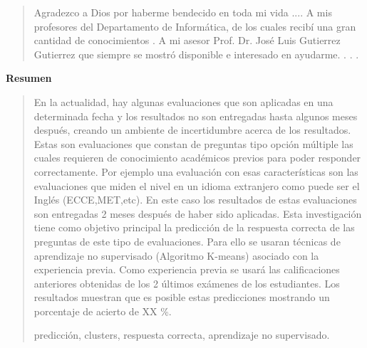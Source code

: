  {\bf\Large {}}
 \vskip 1.5cm
\begin{quotation}
Agradezco a Dios por haberme bendecido en toda mi vida ....
{\vskip 1cm}
A mis profesores del Departamento de Informática, de los cuales recibí una gran cantidad de conocimientos  . 
\vskip 1cm
A  mi  asesor  Prof.  Dr.  José  Luis  Gutierrez Gutierrez  que  siempre  se  mostró disponible e interesado en ayudarme.
\vskip 1cm
 . . .
 \end{quotation}


\newpage
\begin{center}
 {\bf\LARGE Resumen}
\end{center} 
\begin{quotation}
\vskip 0.5cm
En la actualidad, hay algunas evaluaciones que son aplicadas en una determinada fecha y los resultados no son entregadas hasta algunos meses después, creando un ambiente de incertidumbre acerca de los resultados. Estas son evaluaciones que constan  de  preguntas  tipo  opción  múltiple  las  cuales  requieren  de  conocimiento académicos previos para poder responder correctamente. Por ejemplo una evaluación con esas características son las evaluaciones que miden el nivel en un idioma extranjero  como  puede  ser  el  Inglés  (ECCE,MET,etc).  En  este  caso  los  resultados de estas evaluaciones son entregadas 2 meses después de haber sido aplicadas.
\vskip 0.2cm 
Esta investigación tiene como objetivo principal la predicción de la respuesta correcta de las preguntas de este tipo de evaluaciones. Para ello se usaran técnicas de aprendizaje no supervisado (Algoritmo K-means) asociado con la experiencia previa. Como experiencia previa se usará las calificaciones anteriores obtenidas de los 2 últimos exámenes de los estudiantes. Los resultados muestran que es posible estas predicciones mostrando un porcentaje de acierto de XX \%.

\vskip 0.3cm
\hspace*{-0.6cm}{\bf Palabras claves:} predicción, clusters, respuesta correcta, aprendizaje no supervisado.
\end{quotation}


